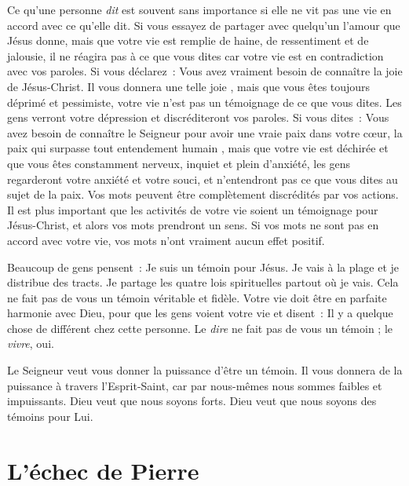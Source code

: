 Ce qu'une personne \emph{dit} est souvent sans importance
 si elle ne vit pas une vie en accord avec ce qu'elle dit.
 Si vous essayez de partager avec quelqu'un l'amour que Jésus donne,
 mais que votre vie est remplie de haine, de ressentiment et de jalousie,
 il ne réagira pas à ce que vous dites car votre vie est en contradiction
 avec vos paroles. Si vous déclarez~:
 \og Vous avez vraiment besoin de connaître la joie de Jésus-Christ.
 Il vous donnera une telle joie \fg{}, mais que vous êtes toujours déprimé
 et pessimiste, votre vie n'est pas un témoignage de ce que vous dites.
 Les gens verront votre dépression et discréditeront vos paroles.
 Si vous dites~: \og Vous avez besoin de connaître le Seigneur pour avoir
 une vraie paix dans votre cœur, la paix qui surpasse
 tout entendement humain \fg{}, mais que votre vie est déchirée
 et que vous êtes constamment nerveux, inquiet et plein d'anxiété,
 les gens regarderont votre anxiété et votre souci,
 et n'entendront pas ce que vous dites au sujet de la paix.
 Vos mots peuvent être complètement discrédités par vos actions.
 Il est plus important que les activités de votre vie soient
 un témoignage pour Jésus-Christ, et alors vos mots prendront un sens.
 Si vos mots ne sont pas en accord avec votre vie,
 vos mots n'ont vraiment aucun effet positif.

Beaucoup de gens pensent~:
 \og Je suis un témoin pour Jésus. Je vais à la plage
 et je distribue des tracts. Je partage les quatre lois spirituelles
 partout où je vais. \fg{}
 Cela ne fait pas de vous un témoin véritable et fidèle.
 Votre vie doit être en parfaite harmonie avec Dieu,
 pour que les gens voient votre vie et disent~:
 \og Il y a quelque chose de différent chez cette personne. \fg{}
 Le \emph{dire} ne fait pas de vous un témoin ; le \emph{vivre}, oui.

Le Seigneur veut vous donner la puissance d'être un témoin.
 Il vous donnera de la puissance à travers l'Esprit-Saint,
 car par nous-mêmes nous sommes faibles et impuissants.
 Dieu veut que nous soyons forts.
 Dieu veut que nous soyons des témoins pour Lui.

\section{L'\'echec de Pierre}

